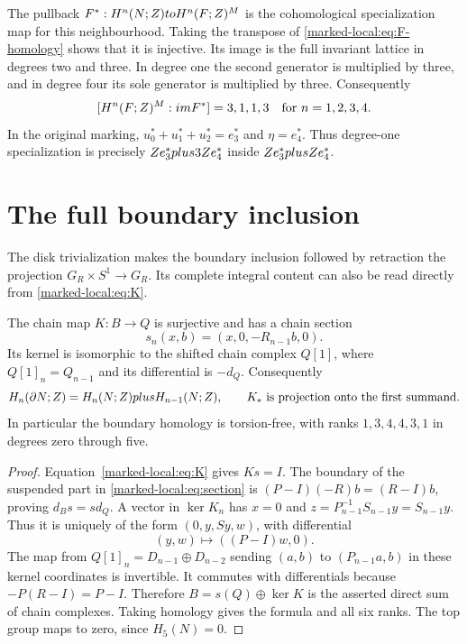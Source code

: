 The pullback $F^*:H^n(N;Z)to H^n(F;Z)^M$ is the
cohomological specialization map for this neighbourhood.
Taking the transpose of \eqref{marked-local:eq:F-homology} shows that it is
injective. Its image is the
full invariant lattice in degrees two and three. In degree one the
second generator is multiplied by three, and in degree four its sole
generator is multiplied by three. Consequently
\begin{equation}\label{marked-local:eq:specialization-indices}
 [H^n(F;Z)^M:im F^*]=3,1,1,3
                         \quad\text{for }n=1,2,3,4.
\end{equation}
In the original marking,
$u_0^*+u_1^*+u_2^*=e_3^*$ and $\eta=e_4^*$.
Thus degree-one specialization is precisely
$Z e_3^*plus3Z e_4^*$ inside
$Z e_3^*plusZ e_4^*$.

\section{The full boundary inclusion}

The disk trivialization makes the boundary inclusion followed by
retraction the projection $G_R\times S^1\to G_R$.
Its complete integral content can also be read directly from
\eqref{marked-local:eq:K}.

\begin{proposition}\label{marked-local:prop:boundary-splitting}
The chain map $K:B\to Q$ is surjective and has a chain section
\begin{equation}\label{marked-local:eq:section}
 s_n(x,b)=(x,0,-R_{n-1}b,0).
\end{equation}
Its kernel is isomorphic to the shifted chain complex $Q[1]$, where
$Q[1]_n=Q_{n-1}$ and its differential is $-d_Q$.
Consequently
\[
 H_n(\partial N;Z)=H_n(N;Z)plus H_{n-1}(N;Z),
 \qquad K_*\text{ is projection onto the first summand}.
\]
In particular the boundary homology is torsion-free, with ranks
$1,3,4,4,3,1$ in degrees zero through five.
\end{proposition}
\begin{proof}
Equation~\eqref{marked-local:eq:K} gives $Ks=I$. The boundary of the suspended
part in \eqref{marked-local:eq:section} is
$(P-I)(-R)b=(R-I)b$, proving $d_Bs=sd_Q$.
A vector in $\ker K_n$ has $x=0$ and
$z=P_{n-1}^{-1}S_{n-1}y=S_{n-1}y$. Thus it is uniquely of the
form $(0,y,Sy,w)$, with differential
\[
                    (y,w)\longmapsto((P-I)w,0).
\]
The map from $Q[1]_n=D_{n-1}\oplus D_{n-2}$ sending
$(a,b)$ to $(P_{n-1}a,b)$ in these kernel coordinates is invertible.
It commutes with differentials because $-P(R-I)=P-I$.
Therefore $B=s(Q)\oplus\ker K$ is the asserted direct sum of
chain complexes. Taking homology gives the formula and all six ranks.
The top group maps to zero, since $H_5(N)=0$.
\end{proof}

